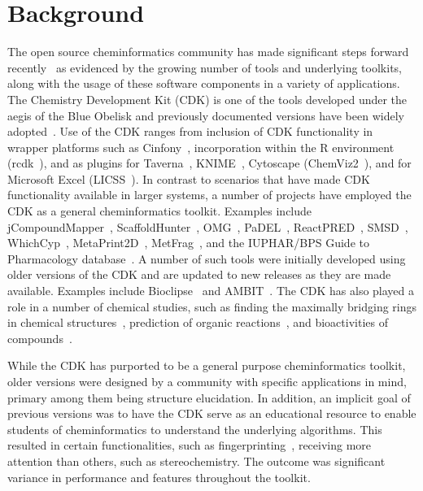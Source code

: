 \documentclass[10pt]{bmcart}
\begin{document}
\section*{Background}

The open source cheminformatics community has made significant steps
forward recently~\cite{OBoyle2011b} as evidenced by the growing number
of tools and underlying toolkits, along with the usage of these
software components in a variety of applications.
The Chemistry Development Kit (CDK) is one of the tools developed
under the aegis of the Blue Obelisk 
and previously documented versions have been widely adopted~\cite{Steinbeck2003,Steinbeck2006}.
Use of the CDK ranges from inclusion of CDK functionality in
wrapper platforms such as Cinfony~\cite{OBoyle2008}, incorporation
within the R environment (rcdk~\cite{Guha2007}), and as plugins for
Taverna~\cite{Truszkowski2011}, 
KNIME~\cite{Beisken2013}, Cytoscape (ChemViz2~\cite{ChemViz2}), and for
Microsoft Excel (LICSS~\cite{Lawson2012}).
In contrast to scenarios that have made CDK functionality available in
larger systems, a number of projects have employed the CDK as a
general cheminformatics toolkit. Examples include 
jCompoundMapper~\cite{Hinselmann2011}, ScaffoldHunter~\cite{wetzel2009interactive}, OMG~\cite{Peironcely2012},
PaDEL~\cite{yap2011padel}, ReactPRED~\cite{ReactPRED}, SMSD~\cite{Rahman2009,Rahman2014,Rahman2016},
WhichCyp~\cite{Rostkowski2013}, MetaPrint2D~\cite{Carlsson2010}, MetFrag~\cite{Wolf2010},
and the IUPHAR/BPS Guide to Pharmacology database~\cite{Southan2016}.
A number of such tools were initially developed using older versions
of the CDK and are updated to new releases as they are made
available. Examples include Bioclipse~\cite{spjuth2007bioclipse,
spjuth2009bioclipse} and
AMBIT~\cite{jeliazkova2011ambit,jeliazkova2011ambitsmarts,kochev2013ambit}. The
CDK has also played a role in a number of chemical studies, such as finding
the maximally bridging rings in chemical structures~\cite{Marth2015},
prediction of organic reactions~\cite{Segler2016}, and bioactivities
of compounds~\cite{Alvarsson2016}.

While the CDK has purported to be a general purpose cheminformatics
toolkit, older versions were designed by a community with specific
applications in mind, primary among them being structure elucidation. In
addition, an implicit goal of previous versions was to have the CDK
serve as an educational resource to enable students of cheminformatics
to understand the underlying algorithms. This resulted in certain
functionalities, such as fingerprinting~\cite{Clark2014,Cannon2006},
receiving more attention than others, such as stereochemistry. The
outcome was significant variance in performance and features
throughout the toolkit.
\end{document}
